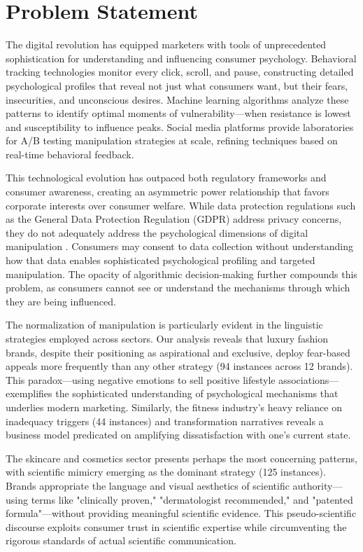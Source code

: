 \section{Problem Statement}
\label{sec:problem_statement}

The digital revolution has equipped marketers with tools of unprecedented sophistication for understanding and influencing consumer psychology. Behavioral tracking technologies monitor every click, scroll, and pause, constructing detailed psychological profiles that reveal not just what consumers want, but their fears, insecurities, and unconscious desires. Machine learning algorithms analyze these patterns to identify optimal moments of vulnerability—when resistance is lowest and susceptibility to influence peaks. Social media platforms provide laboratories for A/B testing manipulation strategies at scale, refining techniques based on real-time behavioral feedback.

This technological evolution has outpaced both regulatory frameworks and consumer awareness, creating an asymmetric power relationship that favors corporate interests over consumer welfare. While data protection regulations such as the General Data Protection Regulation (GDPR) address privacy concerns, they do not adequately address the psychological dimensions of digital manipulation \cite{calo2014digital}. Consumers may consent to data collection without understanding how that data enables sophisticated psychological profiling and targeted manipulation. The opacity of algorithmic decision-making further compounds this problem, as consumers cannot see or understand the mechanisms through which they are being influenced.

The normalization of manipulation is particularly evident in the linguistic strategies employed across sectors. Our analysis reveals that luxury fashion brands, despite their positioning as aspirational and exclusive, deploy fear-based appeals more frequently than any other strategy (94 instances across 12 brands). This paradox—using negative emotions to sell positive lifestyle associations—exemplifies the sophisticated understanding of psychological mechanisms that underlies modern marketing. Similarly, the fitness industry's heavy reliance on inadequacy triggers (44 instances) and transformation narratives reveals a business model predicated on amplifying dissatisfaction with one's current state.

The skincare and cosmetics sector presents perhaps the most concerning patterns, with scientific mimicry emerging as the dominant strategy (125 instances). Brands appropriate the language and visual aesthetics of scientific authority—using terms like "clinically proven," "dermatologist recommended," and "patented formula"—without providing meaningful scientific evidence. This pseudo-scientific discourse exploits consumer trust in scientific expertise while circumventing the rigorous standards of actual scientific communication.

